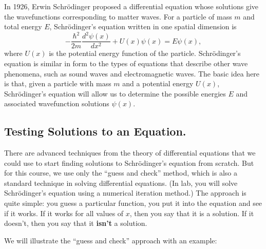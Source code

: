 In 1926, Erwin Schr\"odinger proposed a differential equation whose
solutions give the wavefunctions corresponding to matter waves.  For a
particle of mass $m$ and total energy $E$, Schr\"odinger's equation
written in one spatial dimension is
\begin{equation}
-\frac{\hbar^2}{2m}\frac{d^2\psi(x)}{dx^2} + U(x)\psi(x) = E\psi(x),
\label{eq:schrodinger}
\end{equation}
where $U(x)$ is the potential energy function of the
particle. Schr\"odinger's equation is similar in form to the types of
equations that describe other wave phenomena, such as sound waves and
electromagnetic waves.  The basic idea here is that, given a particle
with mass $m$ and a potential energy $U(x)$, Schr\"odinger's equation
will allow us to determine the possible energies $E$ and associated
wavefunction solutions $\psi(x)$.  

\subsection{Testing Solutions to an Equation.}

There are advanced techniques from the theory of differential equations
that we could use to start finding solutions to Schr\"odinger's equation
from scratch.  But for this course, we use only the ``guess and check''
method, which is also a standard technique in solving differential
equations. (In lab, you will solve Schr\"{o}dinger's equation using a
numerical iteration method.)  The approach is quite simple: you guess
a particular function, you put it into the equation and see if it works.
If it works for all values of $x$, then you say that it is a solution. If
it doesn't, then you say that it {\bf isn't} a solution.

We will illustrate the ``guess and check'' approach with an example:


